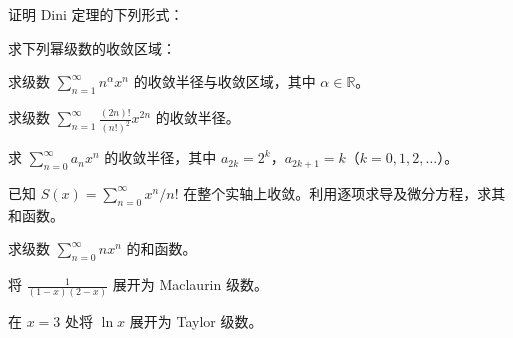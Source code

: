 \noindent\begin{minipage}{\textwidth}
证明 Dini 定理的下列形式：
\end{minipage}\par\vfill
\noindent\begin{minipage}{\textwidth}
求下列幂级数的收敛区域：
\end{minipage}\par\vfill
\noindent\begin{minipage}{\textwidth}
求级数 $\sum_{n=1}^{\infty}n^\alpha x^n$ 的收敛半径与收敛区域，其中 $\alpha\in\mathbb R$。
\end{minipage}\par\vfill
\newpage
\noindent\begin{minipage}{\textwidth}
求级数 $\displaystyle\sum_{n=1}^{\infty}\frac{(2n)!}{(n!)^2}x^{2n}$ 的收敛半径。
\end{minipage}\par\vfill
\noindent\begin{minipage}{\textwidth}
求 $\sum_{n=0}^{\infty}a_nx^n$ 的收敛半径，其中 $a_{2k}=2^k$，$a_{2k+1}=k$（$k=0,1,2,\ldots$）。
\end{minipage}\par\vfill
\noindent\begin{minipage}{\textwidth}
已知 $S(x)=\sum_{n=0}^{\infty}x^n/n!$ 在整个实轴上收敛。利用逐项求导及微分方程，求其和函数。
\end{minipage}\par\vfill
\noindent\begin{minipage}{\textwidth}
求级数 $\sum_{n=0}^{\infty}nx^n$ 的和函数。
\end{minipage}\par\vfill
\newpage
\noindent\begin{minipage}{\textwidth}
将 $\displaystyle\frac1{(1-x)(2-x)}$ 展开为 Maclaurin 级数。
\end{minipage}\par\vfill
\noindent\begin{minipage}{\textwidth}
在 $x=3$ 处将 $\ln x$ 展开为 Taylor 级数。
\end{minipage}\par\vfill
